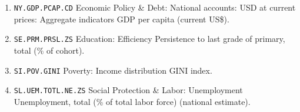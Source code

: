 \begin{enumerate}[1.]
\item \texttt{NY.GDP.PCAP.CD}	Economic Policy \& Debt: National accounts: USD at current prices: Aggregate indicators	GDP per capita (current US\$).
\item \texttt{SE.PRM.PRSL.ZS}	Education: Efficiency	Persistence to last grade of primary, total (\% of cohort).
\item \texttt{SI.POV.GINI}	Poverty: Income distribution GINI index.
\item \texttt{SL.UEM.TOTL.NE.ZS}	Social Protection \& Labor: Unemployment	Unemployment, total (\% of total labor force) (national estimate).
\end{enumerate}




